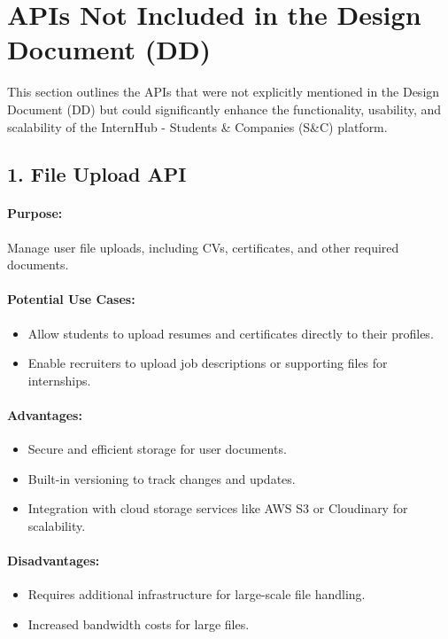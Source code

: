 \section{APIs Not Included in the Design Document (DD)}
This section outlines the APIs that were not explicitly mentioned in the Design Document (DD) but could significantly enhance the functionality, usability, and scalability of the InternHub - Students \& Companies (S\&C) platform.

\subsection*{1. File Upload API}
\paragraph{Purpose:}
Manage user file uploads, including CVs, certificates, and other required documents.

\paragraph{Potential Use Cases:}
\begin{itemize}
    \item Allow students to upload resumes and certificates directly to their profiles.
    \item Enable recruiters to upload job descriptions or supporting files for internships.
\end{itemize}

\paragraph{Advantages:}
\begin{itemize}
    \item Secure and efficient storage for user documents.
    \item Built-in versioning to track changes and updates.
    \item Integration with cloud storage services like AWS S3 or Cloudinary for scalability.
\end{itemize}

\paragraph{Disadvantages:}
\begin{itemize}
    \item Requires additional infrastructure for large-scale file handling.
    \item Increased bandwidth costs for large files.
\end{itemize}


